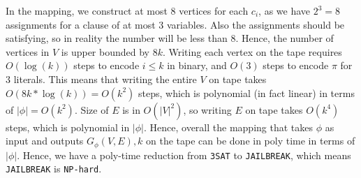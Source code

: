 \documentclass[12pt]{article}
\newcommand{\code}{\texttt}
\begin{document}
\begin{itemize}
  In the mapping, we construct at most 8 vertices for each \(c_i\), as we have \(2^3 = 8\) assignments for a clause of at most 3 variables. Also the assignments should be satisfying, so in reality the number will be less than 8. Hence, the number of vertices in \(V\) is upper bounded by \(8k\). Writing each vertex on the tape requires \(O(\log(k))\) steps to encode \(i \leq k\) in binary, and \(O(3)\) steps to encode \(\pi\) for 3 literals. This means that writing the entire \(V\) on tape takes \(O(8k *\log(k)) = O(k^2)\) steps, which is polynomial (in fact linear) in terms of \(|\phi| = O(k^2)\). Size of \(E\) is in \(O(|V|^2)\), so writing \(E\) on tape takes \(O(k^4)\) steps, which is polynomial in \(|\phi|\). Hence, overall the mapping that takes \(\phi\) as input and outputs \(G_\phi(V,E), k\) on the tape can be done in poly time in terms of \(|\phi|\). Hence, we have a poly-time reduction from \code{3SAT} to \code{JAILBREAK}, which means \code{JAILBREAK} is \code{NP-hard}.
\end{itemize}
 
\end{document}
